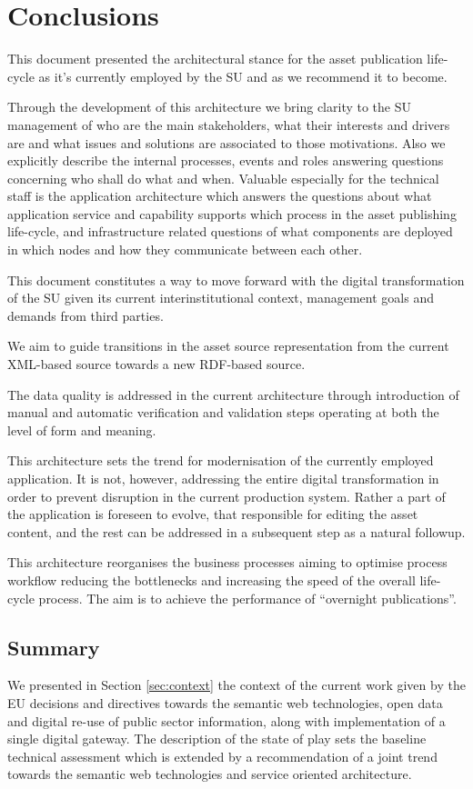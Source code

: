 \chapter{Conclusions}
\label{sec:conclusions}
	
	This document presented the architectural stance for the asset publication life-cycle as it's currently employed by the SU and as we recommend it to become.
	
	Through the development of this architecture we bring clarity to the SU management of who are the main stakeholders, what their interests and drivers are and what issues and solutions are associated to those motivations. Also we explicitly describe the internal processes, events and roles answering questions concerning who shall do what and when. Valuable especially for the technical staff is the application architecture which answers the questions about what application service and capability supports which process in the asset publishing life-cycle, and infrastructure related questions of what components are deployed in which nodes and how they communicate between each other. 
	
	This document constitutes a way to move forward with the digital transformation of the SU given its current interinstitutional context, management goals and demands from third parties.
	
	We aim to guide transitions in the asset source representation from the current XML-based source towards a new RDF-based source. 
	
    The data quality is addressed in the current architecture through introduction of manual and automatic verification and validation steps operating at both the level of form and meaning.
    
    This architecture sets the trend for modernisation of the currently employed application. It is not, however, addressing the entire digital transformation in order to prevent disruption in the current production system. Rather a part of the application is foreseen to evolve, that responsible for editing the asset content, and the rest can be addressed in a subsequent step as a natural followup.
	
	This architecture reorganises the business processes aiming to optimise process workflow reducing the bottlenecks and increasing the speed of the overall life-cycle process. The aim is to achieve the performance of ``overnight publications''. 

	\section{Summary}
	We presented in Section \ref{sec:context} the context of the current work given by the EU decisions and directives towards the semantic web technologies, open data and digital re-use of public sector information, along with implementation of a single digital gateway. The description of the state of play sets the baseline technical assessment which is extended by a recommendation of a joint trend towards the semantic web technologies and service oriented architecture.
	
